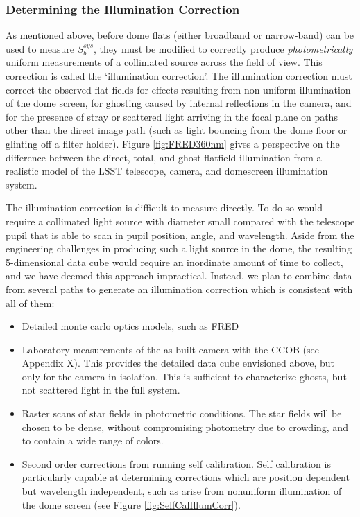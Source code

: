 \documentclass[12pt,preprint]{aastex}
\begin{document}
\subsubsection{Determining the Illumination Correction}
\label{sec:ic}
As mentioned above, before dome flats (either
broadband or narrow-band) can be used to measure
$S_b^{sys}$, they must be modified to correctly produce {\it
photometrically} uniform measurements of a collimated source 
across the field of view. This correction is called the
`illumination correction'.  The illumination correction must correct
the observed flat fields for effects resulting from non-uniform
illumination of the dome screen, for ghosting caused by internal
reflections in the camera, and for the presence of stray or scattered
light arriving in the focal plane on paths other than the direct
image path (such as light bouncing from the dome floor or glinting
off a filter holder). Figure \ref{fig:FRED360nm} gives a perspective
on the difference between the direct, total, and ghost flatfield 
illumination from a realistic model of the LSST telescope, camera,
and domescreen illumination system.

The illumination correction is difficult to measure directly.  To
do so would require a collimated light source with diameter small compared 
with the telescope pupil that is able to scan in pupil position, angle,
and wavelength.  Aside from the engineering challenges in producing such
a light source in the dome, the resulting 5-dimensional data cube would require
an inordinate amount of time to collect, and we have deemed this approach 
impractical.  Instead, we plan to combine data from several paths to generate
an illumination correction which is consistent with all of them:

\begin{itemize}
\item Detailed monte carlo optics models, such as FRED
\item {Laboratory measurements of the as-built camera with the CCOB (see Appendix X).  This provides
the detailed data cube envisioned above, but only for the camera in isolation.  This is sufficient to
characterize ghosts, but not scattered light in the full system.}
\item {Raster scans of star fields in photometric conditions.  The star fields will be chosen
to be dense, without compromising photometry due to crowding, and to contain a wide range of colors.}
\item {Second order corrections from running self calibration.  Self calibration is particularly capable
at determining corrections which are position dependent but wavelength independent, such as 
arise from nonuniform illumination of the dome screen (see Figure \ref{fig:SelfCalIllumCorr}).}
\end{itemize}
\end{document}
